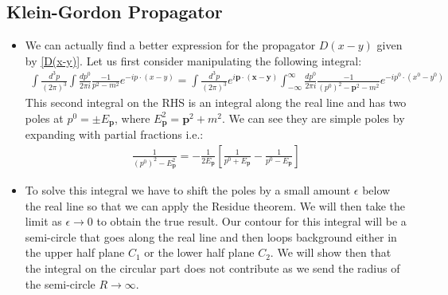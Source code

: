 \documentclass[11pt]{article}
\numberwithin{equation}{section}
\begin{document}
\subsection{Klein-Gordon Propagator}
\begin{itemize}
  \item  We can actually find a better expression for the propagator $D(x-y)$ given by \ref{D(x-y)}. Let us first consider manipulating the following integral:
  \begin{align}
  \label{test_prop}
      \int \frac{d^3p}{(2\pi)^3}\int\frac{dp^{0}}{2\pi i}\frac{-1}{p^2-m^2}e^{-ip\cdot(x-y)} =  \int \frac{d^3p}{(2\pi)^3}e^{i\textbf{p}\cdot(\textbf{x}-\textbf{y})}\int_{-\infty}^{\infty}\frac{dp^{0}}{2\pi i}\frac{-1}{(p^0)^2-\textbf{p}^2-m^2}e^{-ip^0\cdot(x^0-y^0)} 
   \end{align} 
   This second integral on the RHS is an integral along the real line and has two poles at $p^{0} = \pm E_{\textbf{p}}$, where $E_{\textbf{p}}^2 = \textbf{p}^2+m^2$. We can see they are simple poles by expanding with partial fractions i.e.:
   \begin{align*}
   \frac{1}{(p^0)^2-E_{\textbf{p}}^2} = -\frac{1}{2E_{\textbf{p}}}\left[\frac{1}{p^0+E_{\textbf{p}}}-\frac{1}{p^0-E_{\textbf{p}}}\right]
   \end{align*}

   \item To solve this integral we have to shift the poles by a small amount $\epsilon$ below the real line so that we can apply the Residue theorem. We will then take the limit as $\epsilon \rightarrow 0 $ to obtain the true result. Our contour for this integral will be a semi-circle that goes along the real line and then loops background either in the upper half plane $C_1$ or the lower half plane $C_2$. We will show then that the integral on the circular part does not contribute as we send the radius of the semi-circle $R \rightarrow \infty$.


\end{itemize}
\end{document}
